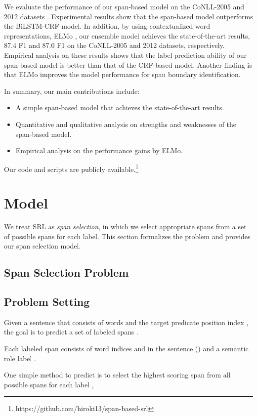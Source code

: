 \documentclass[11pt,a4paper]{article}
\begin{document}
We evaluate the performance of our span-based model on the CoNLL-2005 and 2012 datasets \cite{carreras:05,pradhan:12}.
Experimental results show that the span-based model outperforms the BiLSTM-CRF model.
In addition, by using contextualized word representations, ELMo \cite{peters:18}, our ensemble model achieves the state-of-the-art results, 87.4 F1 and 87.0 F1 on the CoNLL-2005 and 2012 datasets, respectively.
Empirical analysis on these results shows that the label prediction ability of our span-based model is better than that of the CRF-based model.
Another finding is that ELMo improves the model performance for span boundary identification.

In summary, our main contributions include:
\begin{itemize}
\setlength{\parskip}{0cm} 
\setlength{\itemsep}{0cm} 
\item A simple span-based model that achieves the state-of-the-art results.
\item Quantitative and qualitative analysis on strengths and weaknesses of the span-based model.
\item Empirical analysis on the performance gains by ELMo.
\end{itemize}

\noindent
Our code and scripts are publicly available.\footnote{https://github.com/hiroki13/span-based-srl}


\section{Model}
\label{sec:problem}
We treat SRL as {\it span selection}, in which we select appropriate spans from a set of possible spans for each label.
This section formalizes the problem and provides our span selection model.

\subsection{Span Selection Problem}
\subsection*{Problem Setting}
Given a sentence that consists of  words  and the target predicate position index , the goal is to predict a set of labeled spans .


\noindent
Each labeled span  consists of word indices  and   in the sentence () and a semantic role label .

One simple method to predict  is to select the highest scoring span  from all possible spans  for each label ,
\end{document}
